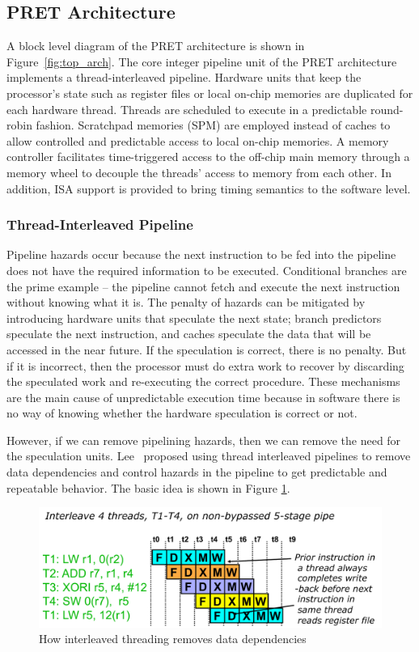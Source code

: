 \documentclass[times, 10pt,twocolumn]{article}
\begin{document}
\subsection{PRET Architecture}
A block level diagram of the PRET architecture is shown in Figure~\ref{fig:top_arch}. The core integer pipeline unit of the PRET architecture implements a thread-interleaved pipeline. Hardware units that keep the processor's state such as register files or local on-chip memories are duplicated for each hardware thread. Threads are scheduled to execute in a predictable round-robin fashion. Scratchpad memories (SPM)\cite{Banakar2002} are employed instead of caches to allow controlled and predictable access to local on-chip memories. A memory controller facilitates time-triggered access to the off-chip main memory through a memory wheel to decouple the threads' access to memory from each other. In addition, ISA support is provided to bring timing semantics to the software level.

\subsubsection {Thread-Interleaved Pipeline}
Pipeline hazards occur because the next instruction to be fed into the pipeline does not have the required information to be executed. Conditional branches are the prime example -- the pipeline cannot fetch and execute the next instruction without knowing what it is. The penalty of hazards can be mitigated by introducing hardware units that speculate the next state; branch predictors speculate the next instruction, and caches speculate the data that will be accessed in the near future. If the speculation is correct, there is no penalty. But if it is incorrect, then the processor must do extra work to recover by discarding the speculated work and re-executing the correct procedure. These mechanisms are the main cause of unpredictable execution time because in software there is no way of knowing whether the hardware speculation is correct or not. 

However, if we can remove pipelining hazards, then we can remove the need for the speculation units. Lee~\cite{lee1987pipeline1} proposed using thread interleaved pipelines to remove data dependencies and control hazards in the pipeline to get predictable and repeatable behavior. The basic idea is shown in Figure \ref{fig:int_pipe}. 
\begin{figure}[ht]
  \centering
  \includegraphics[scale=.35]{./images/interleavedpipeline.pdf}
  \caption{How interleaved threading removes data dependencies}
  \label{fig:int_pipe}
\end{figure}
\end{document}
